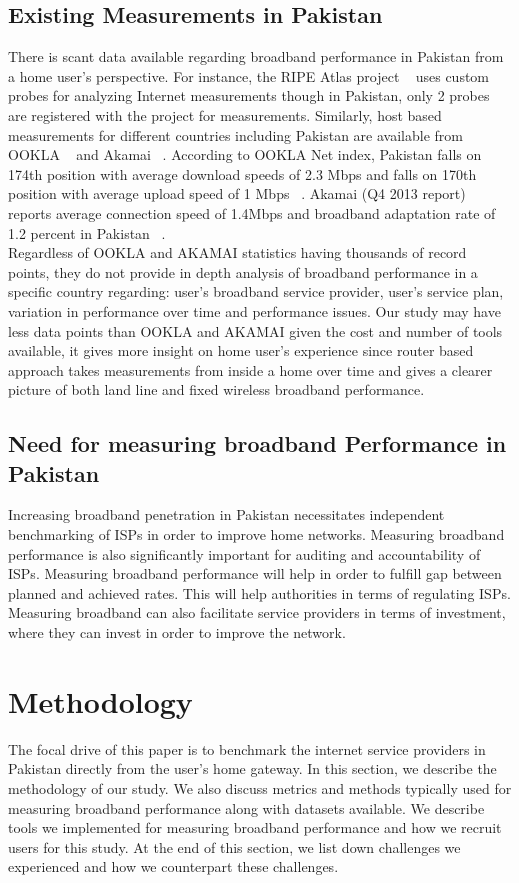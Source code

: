 \documentclass{sig-alternate-10pt}
\begin{document}
\begin{sloppypar}
\subsection {Existing Measurements in Pakistan}
There is scant data available regarding broadband performance in Pakistan from a home user's perspective. For instance, the RIPE Atlas project  ~\cite{21} uses custom probes for analyzing Internet measurements though in Pakistan, only 2 probes are registered with the project for measurements. Similarly, host based measurements for different countries including Pakistan are available from OOKLA ~\cite{20} and Akamai ~\cite{05}. According to OOKLA Net index, Pakistan falls on 174th position with average download speeds of 2.3 Mbps and falls on 170th position with average upload speed of 1 Mbps ~\cite{07}. Akamai (Q4 2013 report) ~\cite{05} reports average connection speed of 1.4Mbps and broadband adaptation rate of 1.2 percent in Pakistan ~\cite{28}.\\
\indent Regardless of OOKLA and AKAMAI statistics having thousands of record points, they do not provide in depth analysis of broadband performance in a specific country regarding: user's broadband service provider, user's service plan, variation in performance over time and performance issues. Our study may have less data points than OOKLA and AKAMAI given the cost and number of tools available, it gives more insight on home user's experience since router based approach takes measurements from inside a home over time and gives a clearer picture of both land line and fixed wireless broadband performance.

\subsection {Need for measuring broadband Performance in Pakistan}
Increasing broadband penetration in Pakistan necessitates independent benchmarking of ISPs in order to improve home networks. Measuring broadband performance is also significantly important for auditing and accountability of ISPs. Measuring broadband performance will help in order to fulfill gap between planned and achieved rates. This will help authorities in terms of regulating ISPs. Measuring broadband can also facilitate service providers in terms of investment, where they can invest in order to improve the network.


\section {Methodology}
The focal drive of this paper is to benchmark the internet service providers in Pakistan directly from the user’s home gateway. In this section, we describe the methodology of our study. We also discuss metrics and methods typically used for measuring broadband performance along with datasets available. We describe tools we implemented for measuring broadband performance and how we recruit users for this study. At the end of this section, we list down challenges we experienced and how we counterpart these challenges.


\end{sloppypar}
\end{document}
